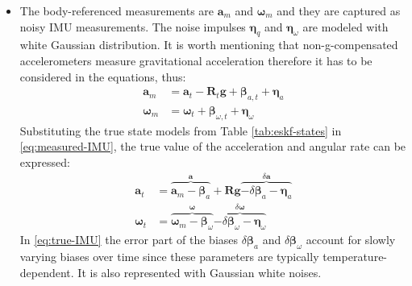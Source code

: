 \begin{itemize}
    \item 
    The body-referenced measurements are $\mathbf{a}_m$ and $\boldsymbol{\omega}_m$ and they are captured as noisy IMU measurements. The noise impulses $\boldsymbol{\eta}_q$ and $\boldsymbol{\eta}_\omega$ are modeled with white Gaussian distribution. It is worth mentioning that non-g-compensated accelerometers measure gravitational acceleration therefore it has to be considered in the equations, thus:  
    \begin{equation}
    \begin{aligned}
        \mathbf{a}_m&=\mathbf{a}_t-\mathbf{R}_t\mathbf{g}+\boldsymbol{\beta}_{a,t}+\boldsymbol{\eta}_a \\
        \boldsymbol{\omega}_m&=\boldsymbol{\omega}_t+\boldsymbol{\beta}_{\omega, t}+\boldsymbol{\eta}_\omega
    \end{aligned}
    \label{eq:measured-IMU}
    \end{equation}
    Substituting the true state models from Table \ref{tab:eskf-states} in \eqref{eq:measured-IMU}, the true value of the acceleration and angular rate can be expressed:
    \begin{equation}
    \begin{aligned}
        \mathbf{a}_t&=\overbrace{\mathbf{a}_m-\boldsymbol{\beta}_a}^\mathbf{a}+ \mathbf{Rg} \overbrace{-\delta\boldsymbol{\beta}_a-\boldsymbol{\eta}_a}^{\delta\mathbf{a}} \\
        \boldsymbol{\omega}_t&=\overbrace{\boldsymbol{\omega}_m-\boldsymbol{\beta}_\omega}^{\boldsymbol{\omega}}\overbrace{-\delta\boldsymbol{\beta}_\omega-\boldsymbol{\eta}_\omega}^{\delta\boldsymbol{\omega}}
    \end{aligned}
    \label{eq:true-IMU}
    \end{equation}
    In \eqref{eq:true-IMU} the error part of the biases $\delta\boldsymbol{\beta}_a$ and $\delta\boldsymbol{\beta}_\omega$ account for slowly varying biases over time since these parameters are typically temperature-dependent. It is also represented with Gaussian white noises.


\end{itemize}
